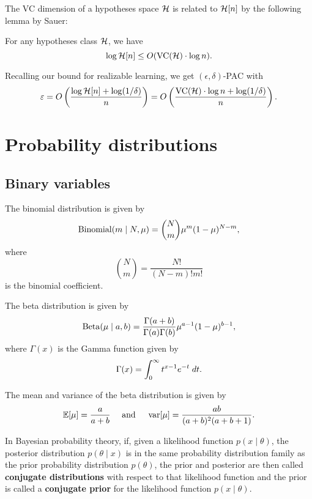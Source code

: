 \documentclass[a4paper]{article}
\begin{document}
The VC dimension of a hypotheses space $\mathcal{H}$ is
related to $\mathcal{H}[n]$ by the following lemma by
Sauer:

\begin{thm}
  For any hypotheses class $\mathcal{H}$, we have
  \[
  \log \mathcal{H}[n] \leq O(\operatorname{VC}(\mathcal{H}) \cdot \log n).
  \]
\end{thm}

Recalling our bound for realizable learning, we get
$(\epsilon, \delta)$-PAC with
\[
\varepsilon = O \left( \frac{\log \mathcal{H}[n] + \log (1 / \delta)}{n} \right)
= O \left( \frac{\operatorname{VC}(\mathcal{H}) \cdot \log n + \log (1 / \delta)}{n} \right).
\]

\section{Probability distributions}

\subsection{Binary variables}

\begin{defi}
The binomial distribution is given by 
\[
\operatorname{Binomial}(m \mid N, \mu) 
= \binom{N}{m} \mu^{m} (1 - \mu)^{N - m},
\]
where 
\[
\binom{N}{m} = \frac{N!}{(N - m)! m!} 
\]
is the binomial coefficient.
\end{defi}

\begin{defi}
The beta distribution is given by 
\[
\operatorname{Beta}(\mu \mid a, b) 
= \frac{\Gamma(a + b)}{\Gamma(a) \Gamma(b)}
\mu^{a - 1} (1 - \mu)^{b - 1},
\]
where $\Gamma(x)$ is the Gamma function given by 
\[
\Gamma(x) = \int_0^\infty t^{x - 1} e^{-t} \; d t.
\]
\end{defi}
The mean and variance of the beta distribution is given 
by 
\[
\begin{aligned}
\mathbb{E}[\mu] = \frac{a}{a + b}
\quad \text{ and } \quad
\operatorname{var}[\mu] = \frac{ab}{(a + b)^2 (a + b + 1)}.
\end{aligned}
\]

\begin{defi}
In Bayesian probability theory, if, given a likelihood 
function $p(x \mid \theta)$, the posterior distribution 
$p(\theta \mid x)$ is in the same probability distribution 
family as the prior probability distribution 
$p(\theta)$, the prior and posterior are then called 
\textbf{conjugate distributions} with respect to that 
likelihood function and the prior is called a \textbf{conjugate 
prior} for the likelihood function $p(x \mid \theta)$. 
\end{defi}
\end{document}
